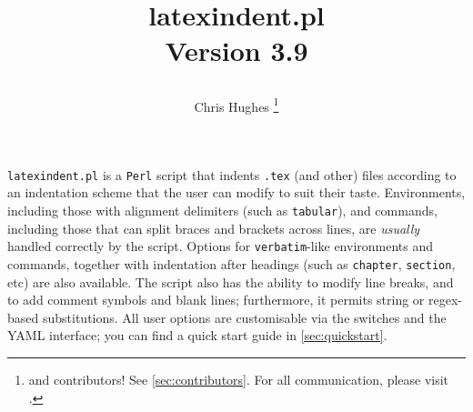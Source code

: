 \title{%
	\begin{tcolorbox}[
			width=5.2cm,
			boxrule=0pt,
			colframe=white!40!black,
			colback=white,
			rightrule=2pt,
			sharp corners,
			enhanced,
			overlay={\node[anchor=north east,outer sep=2pt] at ([xshift=3cm,yshift=4mm]frame.north east) {\texttt{[image: logo]}}; }]
		\centering\ttfamily\bfseries latexindent.pl\\[1cm] Version 3.9
	\end{tcolorbox}
}
\author{Chris Hughes \thanks{and contributors!
		See \vref{sec:contributors}.
		For
		all communication, please visit \cite{latexindent-home}.}}
\maketitle
\begin{adjustwidth}{1cm}{1cm}
	\small
	\texttt{latexindent.pl} is a \texttt{Perl} script that indents \texttt{.tex} (and other) files according to an indentation scheme that the user can modify to suit their taste.
	Environments, including those with alignment delimiters (such as \texttt{tabular}), and commands, including those that can split braces and brackets across lines, are \emph{usually} handled correctly by the script.
	Options for \texttt{verbatim}-like environments and commands, together with indentation after headings (such as \lstinline!chapter!, \lstinline!section!, etc) are also available.
	The script also has the ability to modify line breaks, and to add comment symbols and blank lines; furthermore, it permits string or
	regex-based substitutions.
	All user options are customisable via the switches and the YAML interface; you can find a quick start guide in \vref{sec:quickstart}.
\end{adjustwidth}
